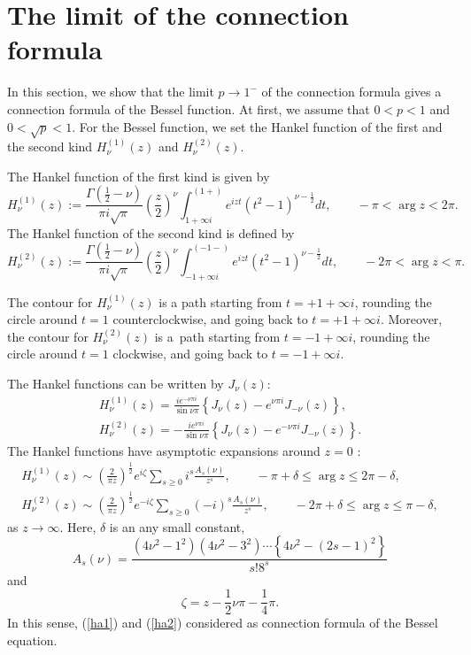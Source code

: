 \documentclass[pdftex]{sigma}
\begin{document}
\section{The limit of the connection formula}\label{section3}

In this section, we show that the limit $p\to 1^-$ of the connection formula gives a connection formula of the Bessel function. At f\/irst, we assume that $0<p<1$ and $0<\sqrt{p}<1$. For the Bessel function, we set the Hankel function of the f\/irst and the second kind $H_\nu^{(1)}(z)$ and $H_\nu^{(2)}(z)$.
\begin{definition}The Hankel function of the f\/irst kind is given by
\[
H_\nu^{(1)}(z):=\frac{\Gamma \left(\frac{1}{2}-\nu\right)}{\pi i\sqrt{\pi}}\left(\frac{z}{2}\right)^\nu\int_{1+\infty i}^{(1+)}e^{izt}\left(t^2-1\right)^{\nu -\frac{1}{2}}dt,\qquad -\pi <\arg z<2\pi .
\]
The Hankel function of the second kind is def\/ined by
\[H_\nu^{(2)}(z):=\frac{\Gamma \left(\frac{1}{2}-\nu\right)}{\pi i\sqrt{\pi}}\left(\frac{z}{2}\right)^\nu\int_{-1+\infty i}^{(-1-)}e^{izt}\left(t^2-1\right)^{\nu -\frac{1}{2}}dt,\qquad -2\pi <\arg z<\pi .\]
\end{definition}
The contour for $H_\nu^{(1)}(z)$ is a path starting from $t=+1+\infty i$, rounding the circle around $t=1$ counterclockwise, and going back to $t=+1+\infty i$. Moreover, the contour for $H_\nu^{(2)}(z)$ is a~path starting from $t=-1+\infty i$, rounding the circle around $t=1$ clockwise, and going back to $t=-1+\infty i$.

The Hankel functions can be written by $J_\nu (z)$:
\begin{gather}
H_\nu^{(1)}(z) =\frac{ie^{-\nu\pi i}}{\sin\nu\pi}\left\{J_\nu (z)-e^{\nu\pi i}J_{-\nu}(z)\right\},\label{ha1}\\
H_\nu^{(2)}(z) =-\frac{ie^{\nu\pi i}}{\sin\nu\pi}\left\{J_\nu (z)-e^{-\nu\pi i}J_{-\nu}(z)\right\}.\label{ha2}
\end{gather}
The Hankel functions have asymptotic expansions around $z=0$ \cite{Ol}:
\begin{gather*}
H_\nu^{(1)}(z) \sim \left(\frac{2}{\pi z}\right)^{\frac{1}{2}}e^{i\zeta}\sum_{s\ge 0}i^s\frac{A_s(\nu )}{z^s},\qquad -\pi +\delta \leq \arg z\leq 2\pi -\delta ,\\
H_\nu^{(2)}(z) \sim \left(\frac{2}{\pi z}\right)^{\frac{1}{2}}e^{-i\zeta}\sum_{s\ge 0}(-i)^s\frac{A_s(\nu )}{z^s},\qquad -2\pi +\delta \leq \arg z\leq \pi -\delta ,
\end{gather*}
as $z\to \infty$. Here, $\delta $ is an any small constant,
\[A_s(\nu )=\frac{(4\nu^2-1^2)(4\nu^2-3^2)\cdots \left\{4\nu^2-(2s-1)^2\right\}}{s!8^s}\]
and
\[\zeta =z-\frac{1}{2}\nu\pi -\frac{1}{4}\pi .\]
In this sense, (\ref{ha1}) and (\ref{ha2}) considered as connection formula of the Bessel equation.
\end{document}
